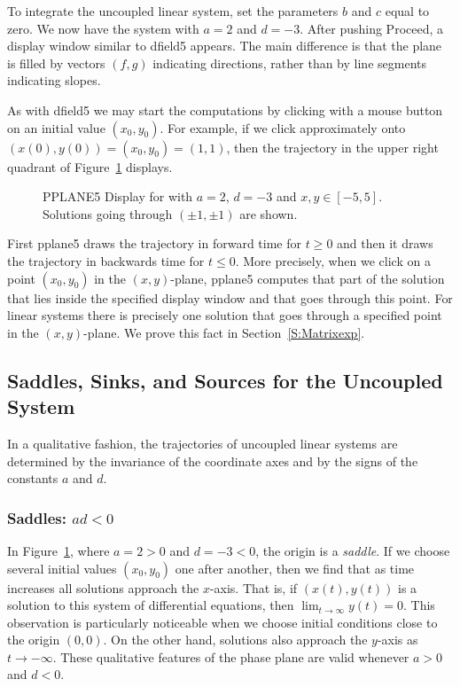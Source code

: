 \documentclass{ximera}
\begin{document}
To integrate the uncoupled linear system, set the parameters $b$
and $c$ equal to zero. We now have the system  with
$a = 2$ and $d = -3$.  After pushing {\sf Proceed}, a display window
similar to {\sf dfield5} appears.  The main difference is that
the plane is filled by vectors $(f,g)$ indicating directions,
rather than by line segments indicating slopes.

As with {\sf dfield5} we may start the computations by clicking
with a mouse button on an initial value $(x_0,y_0)$.  For example,
if we click approximately onto $(x(0),y(0))=(x_0,y_0)=(1,1)$, then
the trajectory in the upper right quadrant of
Figure~\ref{pp_dsp1} displays.

\begin{figure}[htb]
     \centerline{%
     }
     \caption{{\sf PPLANE5 Display} for \protect{} with
             $a=2$, $d=-3$ and $x,y\in [-5,5]$. Solutions
             going through $(\pm 1,\pm 1)$ are shown.}
     \label{pp_dsp1}
\end{figure}

First {\sf pplane5} draws the trajectory in forward time for
$t\ge 0$ and then it draws the trajectory in backwards time for
$t\le 0$.  More precisely, when we click on a point $(x_0,y_0)$ in
the $(x,y)$-plane, {\sf pplane5} computes that part of the
solution that lies inside the specified {\sf display window}
and that goes through this point.  For linear systems there is
precisely one solution that goes through a specified point in
the $(x,y)$-plane. We prove this fact in
Section~\ref{S:Matrixexp}.

\subsection*{Saddles, Sinks, and Sources for the Uncoupled System }

In a qualitative fashion, the trajectories of uncoupled linear
systems are determined by the invariance of the coordinate axes
and by the signs of the constants $a$ and $d$.

\subsubsection*{Saddles: $ad<0$} 

In Figure~\ref{pp_dsp1}, where $a=2>0$ and $d=-3<0$, the origin is a
{\em saddle\/}.  If we choose several initial values $(x_0,y_0)$
one after another,  then we find that as time increases all
solutions approach the $x$-axis.  That is, if $(x(t),y(t))$ is a 
solution to this system of differential equations, then 
$\lim_{t\to\infty}y(t)=0$.  This observation is particularly 
noticeable when we choose initial conditions close to the origin $(0,0)$.  
On the other hand, solutions also approach the $y$-axis as $t\to-\infty$.
These qualitative features of the phase plane are valid whenever 
$a>0$ and $d<0$.
 
\end{document}

